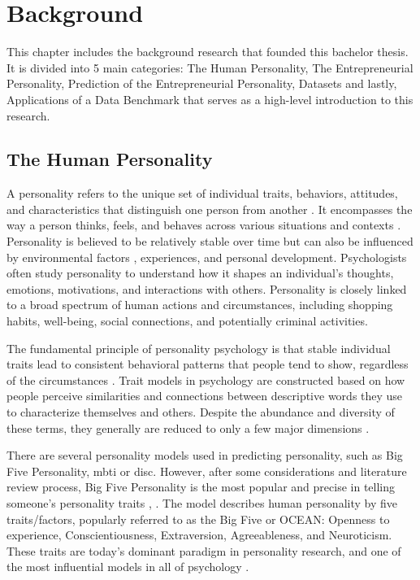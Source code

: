 

%

\chapter{Background}
\label{chap:background}

This chapter includes the background research that founded this bachelor thesis. It is divided into 5 main categories: The Human Personality, The Entrepreneurial Personality, Prediction of the Entrepreneurial Personality, Datasets and lastly, Applications of a Data Benchmark that serves as a high-level introduction to this research.

\section{The Human Personality}
A personality refers to the unique set of individual traits, behaviors, attitudes, and characteristics that distinguish one person from another \cite{kerz2022pushing}. It encompasses the way a person thinks, feels, and behaves across various situations and contexts . Personality is believed to be relatively stable over time but can also be influenced by environmental factors \cite{liao2024open}, experiences, and personal development. Psychologists often study personality to understand how it shapes an individual's thoughts, emotions, motivations, and interactions with others. Personality is closely linked to a broad spectrum of human actions and circumstances, including shopping habits, well-being, social connections, and potentially criminal activities.

The fundamental principle of personality psychology is that stable individual traits lead to consistent behavioral patterns that people tend to show, regardless of the circumstances \cite{vinciarelli2014survey}. Trait models in psychology are constructed based on how people perceive similarities and connections between descriptive words they use to characterize themselves and others. Despite the abundance and diversity of these terms, they generally are reduced  to only a few major dimensions  \cite{vinciarelli2014survey}. 

There are several personality models used in predicting personality, such as Big Five Personality, \ac{mbti} or \ac{disc}. However, after some considerations and literature review process, Big Five Personality is the most popular and precise in telling someone’s personality traits \cite{kerz2022pushing}, \cite{tandera2017personality}. The model describes human personality by five traits/factors, popularly referred to as the Big Five or OCEAN: Openness to experience, Conscientiousness, Extraversion, Agreeableness, and Neuroticism. These traits are today's dominant paradigm in personality research, and one of the most influential models in all of psychology \cite{mccrae2009five}.

